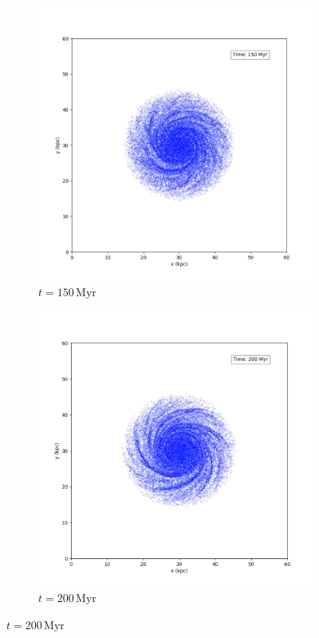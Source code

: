 \begin{figure}[htp]
    \vspace{0.5cm}

    \begin{subfigure}[b]{0.45\textwidth}
        \centering
        \includegraphics[width=\textwidth]{img/p3m/150myr.png}
        \caption{$t=150\,\text{Myr}$}
        \label{fig:spiral-galaxy-evolution-p3m-sub3}
    \end{subfigure}
    \hfill
    \begin{subfigure}[b]{0.45\textwidth}
        \centering
        \includegraphics[width=\textwidth]{img/p3m/200myr.png}
        \caption{$t=200\,\text{Myr}$}
        \label{fig:spiral-galaxy-evolution-p3m-sub4}
    \end{subfigure}


\end{figure}
